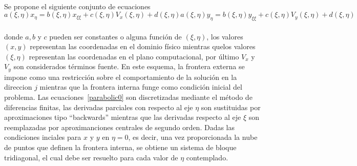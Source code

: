 \documentclass[letterpaper, openright, 12pt]{book}
\begin{document}
    \paragraph*{}
    Se propone el siguiente conjunto de ecuaciones
    \begin{subequations}
        \begin{equation}
            a(\xi, \eta) x_\eta = b(\xi, \eta)x_{\xi\xi}
            + c(\xi, \eta)V_x(\xi, \eta) + d(\xi, \eta)
        \end{equation}
        \begin{equation}
            a(\xi, \eta) y_\eta = b(\xi, \eta)y_{\xi\xi}
            + c(\xi, \eta)V_y(\xi, \eta) + d(\xi, \eta)
        \end{equation}
        \label{parabolic0}
    \end{subequations}\\
    donde $a, b$ y $c$ pueden ser constantes o alguna función de
    $(\xi,\eta)$, los valores $(x, y)$ representan las coordenadas en el
    dominio físico mientras quelos valores $(\xi, \eta)$ representan las
    coordenadas en el plano computacional, por último $V_x$ y $V_y$ son
    considerados términos fuente. En este esquema, la frontera externa se
    impone como una restricción sobre el comportamiento de la solución en la
    direccion $j$ mientras que la frontera interna funge como condición
    inicial del problema. Las ecuaciones~\ref{parabolic0} son discretizadas
    mediante el método de diferencias finitas, las derivadas parciales con
    respecto al eje $\eta$ son sustituidas por aproximaciones tipo
    ``backwards'' mientras que las derivadas respecto al eje $\xi$ son
    reemplazadas por aproximanciones centrales de segundo orden. Dadas las
    condiciones inciales para $x$  y $y$ en $\eta = 0$, es decir, una vez
    proporcionada la nube de puntos que definen la frontera interna, se obtiene
    un sistema de bloque tridiagonal, el cual debe ser resuelto para cada valor
    de $\eta$ contemplado.
\end{document}
